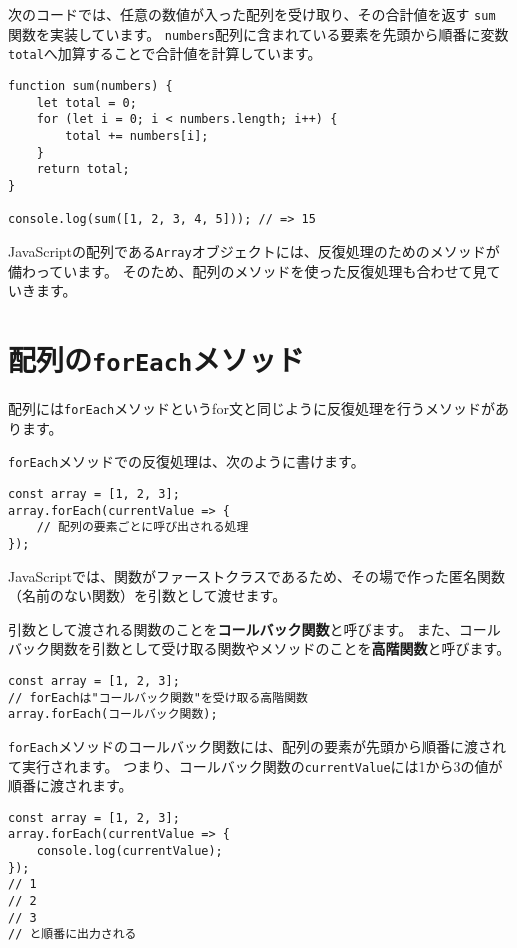 次のコードでは、任意の数値が入った配列を受け取り、その合計値を返す
\texttt{sum} 関数を実装しています。
\texttt{numbers}配列に含まれている要素を先頭から順番に変数\texttt{total}へ加算することで合計値を計算しています。

\begin{lstlisting}
function sum(numbers) {
    let total = 0;
    for (let i = 0; i < numbers.length; i++) {
        total += numbers[i];
    }
    return total;
}

console.log(sum([1, 2, 3, 4, 5])); // => 15
\end{lstlisting}

JavaScriptの配列である\texttt{Array}オブジェクトには、反復処理のためのメソッドが備わっています。
そのため、配列のメソッドを使った反復処理も合わせて見ていきます。

\hypertarget{array-foreach}{%
\section{\texorpdfstring{配列の\texttt{forEach}メソッド}{配列のforEachメソッド}}\label{array-foreach}}

配列には\texttt{forEach}メソッドというfor文と同じように反復処理を行うメソッドがあります。

\texttt{forEach}メソッドでの反復処理は、次のように書けます。

\begin{lstlisting}
const array = [1, 2, 3];
array.forEach(currentValue => {
    // 配列の要素ごとに呼び出される処理
});
\end{lstlisting}

JavaScriptでは、関数がファーストクラスであるため、その場で作った匿名関数（名前のない関数）を引数として渡せます。

引数として渡される関数のことを\textbf{コールバック関数}と呼びます。
また、コールバック関数を引数として受け取る関数やメソッドのことを\textbf{高階関数}と呼びます。

\begin{lstlisting}
const array = [1, 2, 3];
// forEachは"コールバック関数"を受け取る高階関数
array.forEach(コールバック関数);
\end{lstlisting}

\texttt{forEach}メソッドのコールバック関数には、配列の要素が先頭から順番に渡されて実行されます。
つまり、コールバック関数の\texttt{currentValue}には1から3の値が順番に渡されます。

\begin{lstlisting}
const array = [1, 2, 3];
array.forEach(currentValue => {
    console.log(currentValue);
});
// 1
// 2
// 3
// と順番に出力される
\end{lstlisting}

